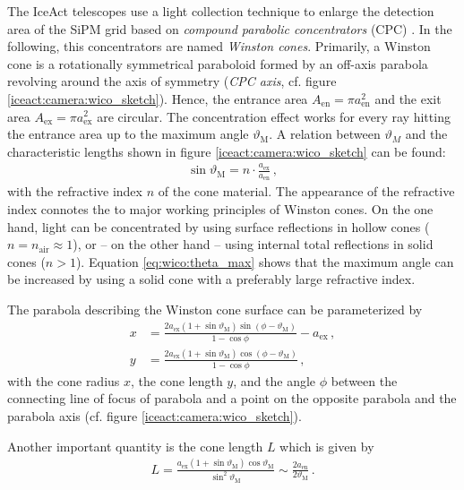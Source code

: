 The IceAct telescopes use a light collection technique to enlarge the detection area of the SiPM grid based on \textit{compound parabolic concentrators} (CPC) \cite{wico:book}. In the following, this concentrators are named \textit{Winston cones}. 
Primarily, a Winston cone is a rotationally symmetrical paraboloid formed by an off-axis parabola revolving around the axis of symmetry (\textit{CPC axis}, cf. figure \ref{iceact:camera:wico_sketch}). Hence, the entrance area $A_\text{en}=\pi a_\text{en}^2$ and the exit area $A_\text{ex}=\pi a_\text{ex}^2$ are circular. The concentration effect works for every ray hitting the entrance area up to the maximum angle $\vartheta_\text{M}$. A relation between $\vartheta_M$ and the characteristic lengths shown in figure \ref{iceact:camera:wico_sketch} can be found: \cite{wico:book,iceact:camera}
\begin{align}
	\sin\vartheta_\text{M} = n\cdot\frac{a_\text{ex}}{a_\text{en}}\,,
	\label{eq:wico:theta_max}
\end{align}
with the refractive index $n$ of the cone material. The appearance of the refractive index connotes the to major working principles of Winston cones. On the one hand, light can be concentrated by using surface reflections in hollow cones ($n=n_\text{air}\approx 1$), or -- on the other hand -- using internal total reflections in solid cones ($n>1$). Equation \eqref{eq:wico:theta_max} shows that the maximum angle can be increased by using a solid cone with a preferably large refractive index.

The parabola describing the Winston cone surface can be parameterized by \cite{wico:book,iceact:camera}
\begin{align}
	x &= \frac{2a_\text{ex}(1+\sin\vartheta_\text{M})\sin(\phi-\vartheta_\text{M})}{1-\cos\phi}-a_\text{ex}\,,\\
	y &= \frac{2a_\text{ex}(1+\sin\vartheta_\text{M})\cos(\phi-\vartheta_\text{M})}{1-\cos\phi}\,,
\end{align}
with the cone radius $x$, the cone length $y$, and the angle $\phi$ between the connecting line of focus of parabola and a point on the opposite parabola and the parabola axis (cf. figure \ref{iceact:camera:wico_sketch}).

Another important quantity is the cone length $L$ which is given by \cite{wico:book,iceact:camera}
\begin{align}
	L = \frac{a_\text{ex}(1+\sin\vartheta_\text{M})\cos\vartheta_\text{M}}{\sin^2\vartheta_\text{M}}\sim\frac{2a_\text{en}}{2\vartheta_\text{M}}\,.
\end{align}

